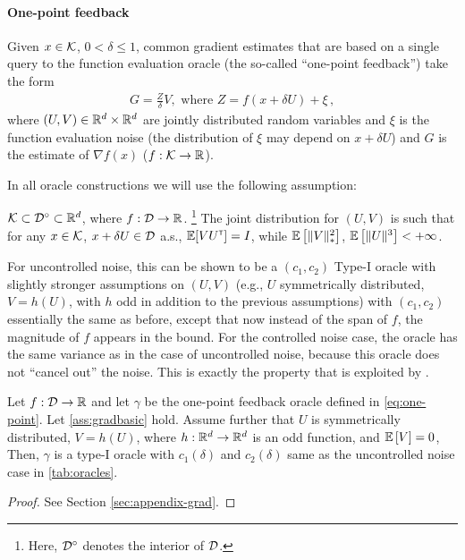 \paragraph{One-point feedback}
Given $x\in \mathcal{K}$, $0<\delta\le 1$, common gradient estimates that are
based on a single query to the function evaluation oracle (the so-called
``one-point feedback'') take the form
\begin{align}
  \label{eq:one-point}
G = \frac{Z}{\delta}V, \textrm{ where } Z = f(x+\delta U) + \xi\,,
\end{align}
where $(U,V)\in \mathbb{R}^d\times \mathbb{R}^d$ are jointly distributed random variables
and $\xi$ is the function evaluation noise (the distribution of $\xi$ may depend on $x+\delta U$) and $G$ is the estimate of $\nabla f(x)$ ($f:\mathcal{K}\to \mathbb{R}$).

In all oracle constructions we will use the following assumption:
\begin{ass}
  \label{ass:gradbasic}
  $\mathcal{K} \subset \mathcal{D}^\circ \subset \mathbb{R}^d$, where $f:\mathcal{D} \to \mathbb{R}$.
  \footnote{Here, $\mathcal{D}^\circ$ denotes the interior of $\mathcal{D}$.}
  The joint distribution for $(U,V)$ is such that
  for any $x\in \mathcal{K}$, $x+\delta U \in \mathcal{D}$ a.s.,
  $\mathbb{E}[V U^\mathsf{\scriptscriptstyle T}] = I$, while
  $\mathbb{E}\left[\|V\|_*^2\right]$, $\mathbb{E}\left[ \|U\|^3 \right]<+\infty$.
\end{ass}

For uncontrolled noise, this can be shown to be a $(c_1,c_2)$ Type-I oracle with slightly stronger assumptions on $(U,V)$ (e.g., $U$ symmetrically distributed, $V = h(U)$, with $h$ odd in addition to the previous assumptions)
with $(c_1,c_2)$ essentially the same as before, except that now instead of the span of $f$, the magnitude of $f$ appears in the bound. For the controlled noise case, the oracle has the same variance as in the case of uncontrolled noise, because this oracle does not ``cancel out'' the noise.%
This is exactly the property that is exploited by \cite{duchi2015optimal}.

\begin{proposition}
\label{prop:grad-onepoint}
Let $f:\mathcal{D} \to \mathbb{R}$ and let $\gamma$ be the one-point feedback oracle defined in \eqref{eq:one-point}.
Let \cref{ass:gradbasic} hold.
Assume further that
  $U$ is symmetrically distributed,
  $V = h(U)$, where $h:\mathbb{R}^d \to \mathbb{R}^d$ is an odd function,
  and
  $\mathbb{E}\left[V\right]=0$,
Then, $\gamma$ is a type-I oracle with $c_1(\delta)$ and $c_2(\delta)$ same as the uncontrolled noise case in \cref{tab:oracles}.
\end{proposition}
\begin{proof}
See Section \ref{sec:appendix-grad}.
\end{proof}


